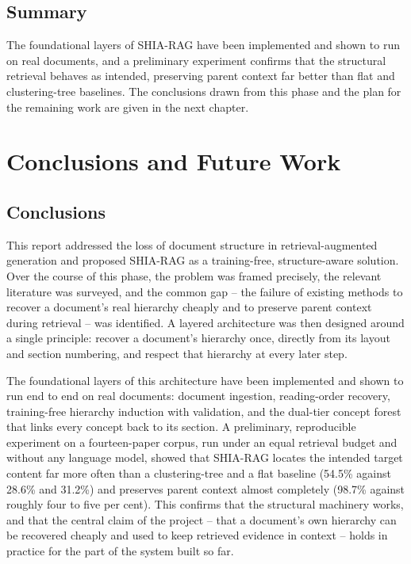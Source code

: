 \documentclass[12pt, a4paper, openright, twoside]{report}
\begin{document}
\section{Summary}
The foundational layers of SHIA-RAG have been implemented and shown to run on real documents, and a preliminary experiment confirms that the structural retrieval behaves as intended, preserving parent context far better than flat and clustering-tree baselines. The conclusions drawn from this phase and the plan for the remaining work are given in the next chapter.

\chapter{Conclusions and Future Work}
\label{conclusion}

\section{Conclusions}
This report addressed the loss of document structure in retrieval-augmented generation and proposed SHIA-RAG as a training-free, structure-aware solution. Over the course of this phase, the problem was framed precisely, the relevant literature was surveyed, and the common gap -- the failure of existing methods to recover a document's real hierarchy cheaply and to preserve parent context during retrieval -- was identified. A layered architecture was then designed around a single principle: recover a document's hierarchy once, directly from its layout and section numbering, and respect that hierarchy at every later step.

The foundational layers of this architecture have been implemented and shown to run end to end on real documents: document ingestion, reading-order recovery, training-free hierarchy induction with validation, and the dual-tier concept forest that links every concept back to its section. A preliminary, reproducible experiment on a fourteen-paper corpus, run under an equal retrieval budget and without any language model, showed that SHIA-RAG locates the intended target content far more often than a clustering-tree and a flat baseline (54.5\% against 28.6\% and 31.2\%) and preserves parent context almost completely (98.7\% against roughly four to five per cent). This confirms that the structural machinery works, and that the central claim of the project -- that a document's own hierarchy can be recovered cheaply and used to keep retrieved evidence in context -- holds in practice for the part of the system built so far.
\end{document}
